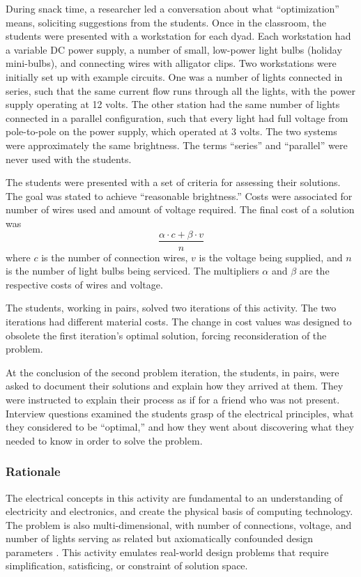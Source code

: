 	During snack time, a researcher led a conversation about what
	{}``optimization'' means, soliciting suggestions from the students.
	Once in the classroom, the students were presented with a workstation
	for each dyad. Each workstation had a variable DC power supply,
	a number of small, low-power light bulbs (holiday mini-bulbs), and
	connecting wires with alligator clips. Two workstations were initially
	set up with example circuits. One was a number of lights connected
	in series, such that the same current flow runs through all the lights,
	with the power supply operating at 12 volts. The other station had the same number of lights connected in a parallel configuration,
	such that every light had full voltage from pole-to-pole on the power
	supply, which operated at 3 volts. The two systems were
	approximately the same brightness. The terms {}``series'' and {}``parallel''
	were never used with the students.
	
	The students were presented with a set of criteria for assessing
	their solutions. The goal was stated to achieve {}``reasonable
	brightness.'' Costs were associated for number of wires used and
	amount of voltage required. The final cost of a solution was \[
	\frac{\alpha\cdot c+\beta\cdot v}{n}\]
	where $c$ is the number of connection wires, $v$ is the voltage
	being supplied, and $n$ is the number of light bulbs being serviced.
	The multipliers $\alpha$ and $\beta$ are the respective costs of
	wires and voltage.
	
	The students, working in pairs, solved two iterations of this
	activity. The two iterations had different material costs. The
	change in cost values was designed to obsolete the first iteration's
	optimal solution, forcing reconsideration of the problem.
	
	At the conclusion of the second problem iteration, the students, in
	pairs, were asked to document their solutions and explain how they
	arrived at them. They were instructed to explain their process
	as if for a friend who was not present. Interview questions examined
	the students grasp of the electrical principles, what they considered
	to be {}``optimal,'' and how they went about discovering what they
	needed to know in order to solve the problem.
	
	
	\subsubsection{Rationale}
	
	The electrical concepts in this activity are fundamental to an understanding
	of electricity and electronics, and create the physical basis of computing
	technology. The problem is also multi-dimensional, with number of
	connections, voltage, and number of lights serving as related but
	axiomatically confounded design parameters \citet{axiomatic}. This
	activity emulates real-world design problems that require simplification,
	satisficing, or constraint of solution space.

